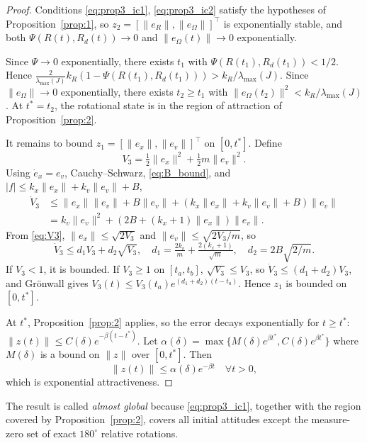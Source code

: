 \documentclass[11pt]{article}
\theoremstyle{remark}
\newcommand{\lmax}{\lambda_{\max}}
\begin{document}
\begin{proof}
Conditions \eqref{eq:prop3_ic1}, \eqref{eq:prop3_ic2} satisfy the hypotheses of Proposition~\ref{prop:1}, so $z_2 = [\|e_R\|,\|e_\Omega\|]^\top$ is exponentially stable, and both $\Psi(R(t),R_d(t)) \to 0$ and $\|e_\Omega(t)\| \to 0$ exponentially.

Since $\Psi \to 0$ exponentially, there exists $t_1$ with $\Psi(R(t_1),R_d(t_1)) < 1/2$. Hence $\tfrac{2}{\lmax(J)}k_R(1-\Psi(R(t_1),R_d(t_1))) > k_R/\lmax(J)$. Since $\|e_\Omega\| \to 0$ exponentially, there exists $t_2 \ge t_1$ with $\|e_\Omega(t_2)\|^2 < k_R/\lmax(J)$. At $t^* = t_2$, the rotational state is in the region of attraction of Proposition~\ref{prop:2}.

It remains to bound $z_1 = [\|e_x\|,\|e_v\|]^\top$ on $[0, t^*]$. Define
\begin{equation}
V_3 = \tfrac{1}{2}\|e_x\|^2 + \tfrac{1}{2}m\|e_v\|^2.
\label{eq:V3}
\end{equation}
Using $\dot e_x = e_v$, Cauchy--Schwarz, \eqref{eq:B_bound}, and $|f| \le k_x\|e_x\| + k_v\|e_v\| + B$,
\begin{align*}
\dot V_3
&\le \|e_x\|\|e_v\| + B\|e_v\| + (k_x\|e_x\|+k_v\|e_v\|+B)\|e_v\|\\
&= k_v\|e_v\|^2 + (2B + (k_x+1)\|e_x\|)\|e_v\|.
\end{align*}
From \eqref{eq:V3}, $\|e_x\| \le \sqrt{2V_3}$ and $\|e_v\| \le \sqrt{2V_3/m}$, so
\[
\dot V_3 \le d_1 V_3 + d_2\sqrt{V_3},\quad d_1 = \tfrac{2k_v}{m} + \tfrac{2(k_x+1)}{\sqrt{m}},\quad d_2 = 2B\sqrt{2/m}.
\]
If $V_3 < 1$, it is bounded. If $V_3 \ge 1$ on $[t_a,t_b]$, $\sqrt{V_3} \le V_3$, so $\dot V_3 \le (d_1+d_2)V_3$, and Gr\"onwall gives $V_3(t) \le V_3(t_a)e^{(d_1+d_2)(t-t_a)}$. Hence $z_1$ is bounded on $[0,t^*]$.

At $t^*$, Proposition~\ref{prop:2} applies, so the error decays exponentially for $t \ge t^*$: $\|z(t)\| \le C(\delta)e^{-\beta(t-t^*)}$. Let $\alpha(\delta) = \max\{M(\delta)e^{\beta t^*}, C(\delta)e^{\beta t^*}\}$ where $M(\delta)$ is a bound on $\|z\|$ over $[0,t^*]$. Then
\[
\|z(t)\| \le \alpha(\delta)e^{-\beta t}\quad \forall t>0,
\]
which is exponential attractiveness.
\end{proof}

The result is called \emph{almost global} because \eqref{eq:prop3_ic1}, together with the region covered by Proposition~\ref{prop:2}, covers all initial attitudes except the measure-zero set of exact $180^\circ$ relative rotations.

\end{document}
